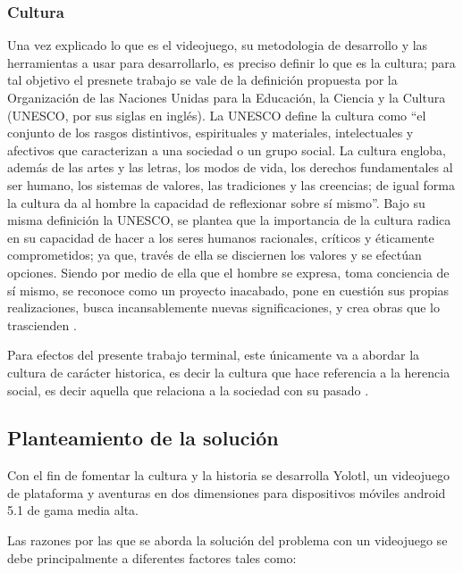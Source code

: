 \subsubsection{Cultura}
Una vez explicado lo que es el videojuego, su metodologia de desarrollo y las 
herramientas a usar para desarrollarlo, es preciso definir lo que es la cultura; 
para tal objetivo el presnete trabajo se vale de la definición propuesta por la 
Organización de las Naciones Unidas para la Educación, la Ciencia y la Cultura 
(UNESCO, por sus siglas en inglés). La UNESCO define la cultura como “el conjunto 
de los rasgos distintivos, espirituales y materiales, intelectuales y afectivos 
que caracterizan a una sociedad o un grupo social. La cultura engloba, además 
de las artes y las letras, los modos de vida, los derechos fundamentales al ser 
humano, los sistemas de valores, las tradiciones y las creencias; de igual forma 
la cultura da al hombre la capacidad de reflexionar sobre sí mismo\cite{RefCultura}”. 
Bajo su misma definición la UNESCO, se plantea que la importancia de la cultura 
radica en su capacidad de hacer a los seres humanos racionales, críticos y 
éticamente comprometidos; ya que, través de ella se disciernen los valores y se 
efectúan opciones. Siendo por medio de ella que el hombre se expresa, toma conciencia 
de sí mismo, se reconoce como un proyecto inacabado, pone en cuestión sus propias 
realizaciones, busca incansablemente nuevas significaciones, y crea obras que lo 
trascienden \cite{RefCultura}.
\\
\par
Para efectos del presente trabajo terminal, este únicamente va a abordar la cultura 
de carácter historica, es decir la cultura que hace referencia a la herencia social, 
es decir aquella que relaciona a la sociedad con su pasado
\cite{RefculturaClasificacionEl}.

\subsection{Planteamiento de la solución}
Con el fin de fomentar la cultura y la historia se desarrolla Yolotl, un videojuego 
de plataforma y aventuras en dos dimensiones para dispositivos móviles android 5.1 
de gama media alta.
\\
\par
Las razones por las que se aborda la solución del problema con un videojuego se 
debe principalmente a diferentes factores tales como:

